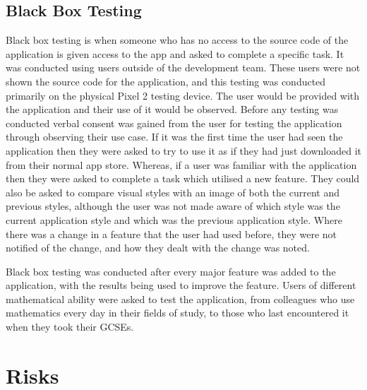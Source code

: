 \documentclass{article}
\begin{document}
\subsection{Black Box Testing}

Black box testing is when someone who has no access to the source code of the application is given access to the app and asked to complete a specific task. It was conducted using users outside of the development team. These users were not shown the source code for the application, and this testing was conducted primarily on the physical Pixel 2 testing device. The user would be provided with the application and their use of it would be observed. Before any testing was conducted verbal consent was gained from the user for testing the application through observing their use case. If it was the first time the user had seen the application then they were asked to try to use it as if they had just downloaded it from their normal app store. Whereas, if a user was familiar with the application then they were asked to complete a task which utilised a new feature. They could also be asked to compare visual styles with an image of both the current and previous styles, although the user was not made aware of which style was the current application style and which was the previous application style. Where there was a change in a feature that the user had used before, they were not notified of the change, and how they dealt with the change was noted. \par

Black box testing was conducted after every major feature was added to the application, with the results being used to improve the feature. Users of different mathematical ability were asked to test the application, from colleagues who use mathematics every day in their fields of study, to those who last encountered it when they took their GCSEs. \par

\section{Risks}
\label{section:risks}
\end{document}
